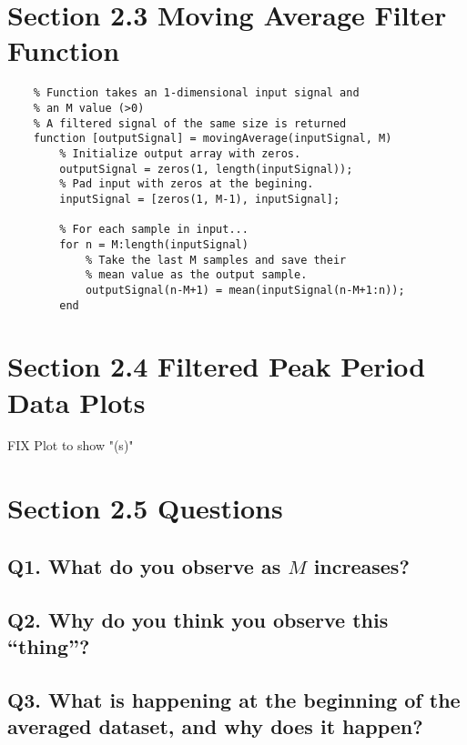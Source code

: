 \documentclass[titlepage]{scrartcl}
\begin{document}
    \begin{figure}[H]
    \end{figure}

    \section*{Section 2.3 Moving Average Filter Function}
    \begin{lstlisting}
    % Function takes an 1-dimensional input signal and
    % an M value (>0) 
    % A filtered signal of the same size is returned
    function [outputSignal] = movingAverage(inputSignal, M)
        % Initialize output array with zeros.
        outputSignal = zeros(1, length(inputSignal));
        % Pad input with zeros at the begining.
        inputSignal = [zeros(1, M-1), inputSignal];

        % For each sample in input...
        for n = M:length(inputSignal)
            % Take the last M samples and save their
            % mean value as the output sample.
            outputSignal(n-M+1) = mean(inputSignal(n-M+1:n));
        end
    \end{lstlisting}

    \section*{Section 2.4 Filtered Peak Period Data Plots}
    FIX Plot to show "(s)"
    \begin{figure}[H]
    \end{figure}

    \section*{Section 2.5 Questions}
    \subsection*{Q1. What do you observe as $M$ increases?}
    \subsection*{Q2. Why do you think you observe this ``thing''?}
    \subsection*{Q3. What is happening at the beginning of the averaged dataset, and why does it happen?}
\end{document}
